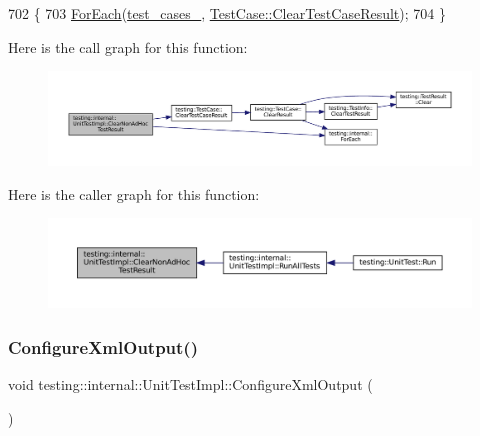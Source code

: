 \begin{DoxyCode}
702                                  \{
703     \hyperlink{namespacetesting_1_1internal_a52f5504ed65d116201ccb8f99a44fd7e}{ForEach}(\hyperlink{classtesting_1_1internal_1_1UnitTestImpl_a79ec0f733ada2898efd1a7fbd8587fb3}{test\_cases\_}, \hyperlink{classtesting_1_1TestCase_a1c05fe33863b79b1b1ed19e665a1cea7}{TestCase::ClearTestCaseResult});
704   \}
\end{DoxyCode}
Here is the call graph for this function\+:
\nopagebreak
\begin{figure}[H]
\begin{center}
\leavevmode
\includegraphics[width=350pt]{classtesting_1_1internal_1_1UnitTestImpl_a96c2a5b23541ef01020c402644563ba1_cgraph}
\end{center}
\end{figure}
Here is the caller graph for this function\+:
\nopagebreak
\begin{figure}[H]
\begin{center}
\leavevmode
\includegraphics[width=350pt]{classtesting_1_1internal_1_1UnitTestImpl_a96c2a5b23541ef01020c402644563ba1_icgraph}
\end{center}
\end{figure}
\mbox{\label{classtesting_1_1internal_1_1UnitTestImpl_a21cd7b2928de03a55b5252f29dd5ae6d}} 
\subsubsection{\texorpdfstring{Configure\+Xml\+Output()}{ConfigureXmlOutput()}}
{\footnotesize\ttfamily void testing\+::internal\+::\+Unit\+Test\+Impl\+::\+Configure\+Xml\+Output (\begin{DoxyParamCaption}{ }\end{DoxyParamCaption})}



